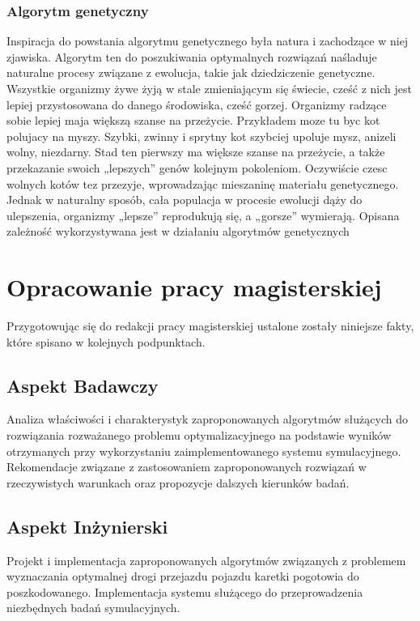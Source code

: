 \documentclass[12pt]{article} %
\begin{document}
\subsubsection{Algorytm genetyczny}
Inspiracja do powstania algorytmu genetycznego była natura i zachodzące
w niej zjawiska. Algorytm ten do poszukiwania optymalnych
rozwiązań naśladuje naturalne procesy związane z ewolucja, takie jak
dziedziczenie genetyczne. Wszystkie organizmy żywe żyją w stale zmieniającym
się świecie, cześć z nich jest lepiej przystosowana do danego
środowiska, cześć gorzej. Organizmy radzące sobie lepiej maja większą
szanse na przeżycie. Przykładem moze tu byc kot polujacy na myszy.
Szybki, zwinny i sprytny kot szybciej upoluje mysz, anizeli wolny, niezdarny.
Stad ten pierwszy ma większe szanse na przeżycie, a także przekazanie
swoich „lepszych” genów kolejnym pokoleniom. Oczywiście czesc
wolnych kotów tez przezyje, wprowadzając mieszaninę materiału genetycznego.
Jednak w naturalny sposób, cała populacja w procesie ewolucji
dąży do ulepszenia, organizmy „lepsze” reprodukują się, a „gorsze” wymierają.
Opisana zależność wykorzystywana jest w działaniu algorytmów
genetycznych
\section{Opracowanie pracy magisterskiej}

Przygotowując się do redakcji pracy magisterskiej ustalone zostały niniejsze fakty, które spisano w kolejnych podpunktach.

\subsection{Aspekt Badawczy}
Analiza właściwości i charakterystyk zaproponowanych algorytmów służących do rozwiązania rozważanego problemu optymalizacyjnego na podstawie wyników otrzymanych przy wykorzystaniu zaimplementowanego systemu symulacyjnego. Rekomendacje związane z zastosowaniem zaproponowanych rozwiązań w rzeczywistych warunkach oraz propozycje dalszych kierunków badań.

\subsection{Aspekt Inżynierski}
Projekt i implementacja zaproponowanych algorytmów związanych z problemem wyznaczania optymalnej drogi przejazdu pojazdu karetki pogotowia do poszkodowanego. Implementacja systemu służącego do przeprowadzenia niezbędnych badań symulacyjnych.
\end{document}
